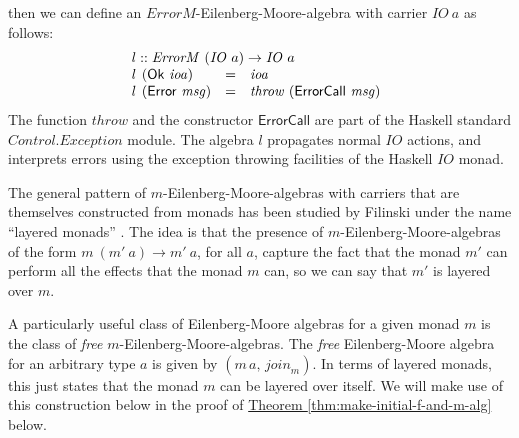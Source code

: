 \documentclass{jfp1}
\newcommand{\thmref}[1]{\hyperref[#1]{Theorem \ref*{#1}}}
\begin{document}
then we can define an $\mathit{ErrorM}$-Eilenberg-Moore-algebra with
carrier $\mathit{IO}~a$ as follows:
\begin{displaymath}
  \begin{array}{l}
    l :: \mathit{ErrorM}~(\mathit{IO}~a) \to \mathit{IO}~a \\
    \begin{array}{@{}l@{\hspace{0.4em}}lcl}
      l&(\mathsf{Ok}~\mathit{ioa}) & = & \mathit{ioa} \\
      l&(\mathsf{Error}~\mathit{msg}) & = & \mathit{throw}~(\mathsf{ErrorCall}~\mathit{msg})
    \end{array}
  \end{array}
\end{displaymath}
The function $\mathit{throw}$ and the constructor $\mathsf{ErrorCall}$
are part of the Haskell standard $\mathit{Control.Exception}$
module. The algebra $l$ propagates normal $\mathit{IO}$ actions, and
interprets errors using the exception throwing facilities of the
Haskell $\mathit{IO}$ monad.

The general pattern of $m$-Eilenberg-Moore-algebras with carriers that
are themselves constructed from monads has been studied by Filinski
under the name ``layered monads'' \cite{filinski99representing}. The
idea is that the presence of $m$-Eilenberg-Moore-algebras of the form
$m~(m'~a) \to m'~a$, for all $a$, capture the fact that the monad $m'$
can perform all the effects that the monad $m$ can, so we can say that
$m'$ is layered over $m$.

A particularly useful class of Eilenberg-Moore algebras for a given
monad $m$ is the class of \emph{free}
$m$-Eilenberg-Moore-algebras. The \emph{free} Eilenberg-Moore algebra
for an arbitrary type $a$ is given by $(m\,a, \,\mathit{join}_m)$. In
terms of layered monads, this just states that the monad $m$ can be
layered over itself. We will make use of this construction below in
the proof of \thmref{thm:make-initial-f-and-m-alg} below.
\end{document}
